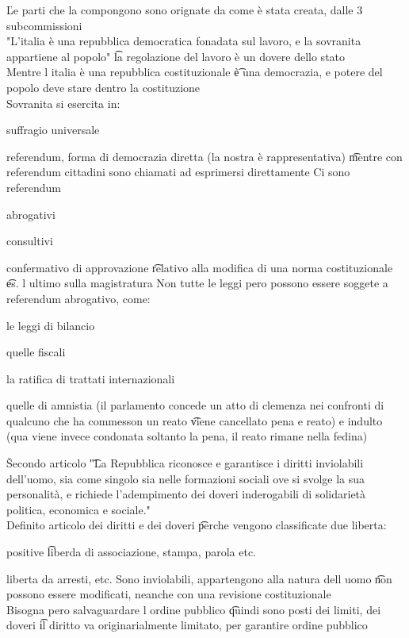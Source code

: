\documentclass[12pt]{article}
\begin{document}
\v

Le parti che la compongono sono orignate da come è stata creata, dalle 3 subcommissioni \\
"L'italia è una repubblica democratica fonadata sul lavoro, e la sovranita appartiene al popolo" \t la regolazione del lavoro è un dovere dello stato \\
Mentre l italia è una repubblica costituzionale \t è una democrazia, e potere del popolo deve stare dentro la costituzione \\
Sovranita si esercita in:
\bi
\item suffragio universale
\item referendum, forma di democrazia diretta (la nostra è rappresentativa) \t mentre con referendum cittadini sono chiamati ad esprimersi direttamente
\ei
Ci sono referendum 
\bi
  \item abrogativi
  \item consultivi
  \item confermativo di approvazione \t relativo alla modifica di una norma costituzionale \t es. l ultimo sulla magistratura
\ei
Non tutte le leggi pero possono essere soggete a referendum abrogativo, come:
\bi
  \item le leggi di bilancio
  \item quelle fiscali
  \item la ratifica di trattati internazionali
  \item quelle di amnistia (il parlamento concede un atto di clemenza nei confronti di qualcuno che ha commesson un reato \t viene cancellato pena e reato) e indulto (qua viene invece condonata soltanto la pena, il reato rimane nella fedina)
\ei

\v

Secondo articolo \t "La Repubblica riconosce e garantisce i diritti inviolabili dell'uomo, sia come singolo sia nelle formazioni sociali ove si svolge la sua personalità, e richiede l'adempimento dei doveri inderogabili di solidarietà politica, economica e sociale." \\
Definito articolo dei diritti e dei doveri \t perche vengono classificate due liberta:
\bi
  \item positive \t liberda di associazione, stampa, parola etc.
  \item liberta da arresti, etc.
\ei
Sono inviolabili, appartengono alla natura dell uomo \t non possono essere modificati, neanche con una revisione costituzionale \\
Bisogna pero salvaguardare l ordine pubblico \t quindi sono posti dei limiti, dei doveri \t il diritto va originarialmente limitato, per garantire ordine pubblico
\end{document}
